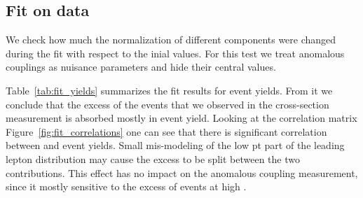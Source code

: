 \subsection{Fit on data}
We check how much the normalization of different components were
changed during the fit with respect to the inial values. For this test
we treat anomalous couplings as nuisance parameters and hide their
central values.

Table~\ref{tab:fit_yields} summarizes the fit results for event
yields. From it we conclude that the excess of the events that we
observed in the cross-section measurement is absorbed mostly in \wjets
event yield. Looking at the correlation matrix
Figure~\ref{fig:fit_correlations} one can see that there is
significant correlation between \wjets and \ww event yields. Small
mis-modeling of the low pt part of the leading lepton distribution may
cause the excess to be split between the two contributions. This
effect has no impact on the anomalous coupling measurement, since it
mostly sensitive to the excess of events at high \pt{}.

